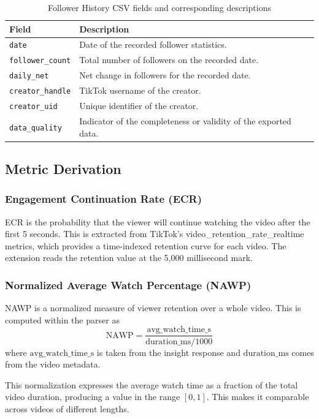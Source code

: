 \begin{table}[H]
\centering
\begin{tabular}{p{} p{}}
\toprule
\textbf{Field} & \textbf{Description} \\
\midrule
\texttt{date} & Date of the recorded follower statistics. \\
\texttt{follower\_count} & Total number of followers on the recorded date. \\
\texttt{daily\_net} & Net change in followers for the recorded date. \\
\texttt{creator\_handle} & TikTok username of the creator. \\
\texttt{creator\_uid} & Unique identifier of the creator. \\
\texttt{data\_quality} & Indicator of the completeness or validity of the exported data. \\
\bottomrule
\end{tabular}
\caption{Follower History CSV fields and corresponding descriptions}
\label{tab:follower_history_csv}
\end{table}

\subsection{Metric Derivation}

\subsubsection{Engagement Continuation Rate (ECR)}

ECR is the probability that the viewer will continue watching the video after the first 5 seconds. This is extracted from TikTok's video\_retention\_rate\_realtime metrics, which provides a time-indexed retention curve for each video. The extension reads the retention value at the 5,000 millisecond mark.

\subsubsection{Normalized Average Watch Percentage (NAWP)}

NAWP is a normalized measure of viewer retention over a whole video. This is computed within the parser as
\begin{equation}
    \text{NAWP} = \frac{\text{avg\_watch\_time\_s}}{\text{duration\_ms} / 1000}
\end{equation}
where $\text{avg\_watch\_time\_s}$ is taken from the insight response and $\text{duration\_ms}$ comes from the video metadata.

This normalization expresses the average watch time as a fraction of the total video duration, producing a value in the range $[0,1]$. This makes it comparable across videos of different lengths.
